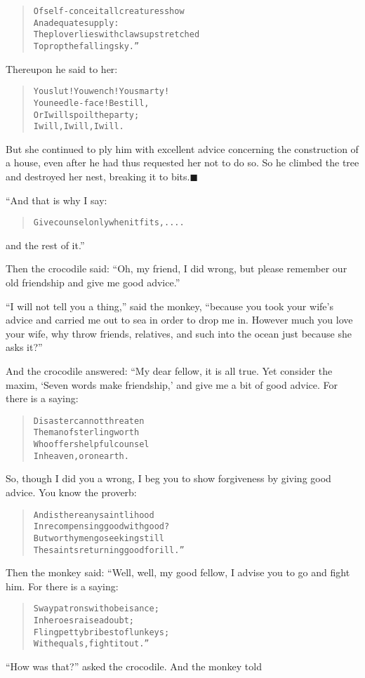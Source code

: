\documentclass[article, twoside, 14pt]{memoir}
\newcommand{\qed}{\hfill \ensuremath{\blacksquare}}
\renewenvironment{verbatim}{%
\begin{quote}%
\vskip -10pt%
\begin{alltt}\normalfont\large}{\end{alltt}%
\end{quote}%
\vskip -10pt
} %
\begin{document}
\begin{verbatim}
Of self-conceit all creatures show
    An adequate supply:
The plover lies with claws upstretched
    To prop the falling sky.”
\end{verbatim}
Thereupon he said to her:

\begin{verbatim}
You slut! You wench! You smarty!
    You needle-face! Be still,
Or I will spoil the party;
    I will, I will, I will.
\end{verbatim}
But she continued to ply him with excellent advice concerning the
construction of a house, even after he had thus requested her not
to do so. So he climbed the tree and destroyed her nest, breaking
it to bits.\hyperref[s75]{\qed}

“And that is why I say:

\begin{verbatim}
Give counsel only when it fits, ....
\end{verbatim}
and the rest of it.”

Then the crocodile said:
``Oh, my friend, I did wrong, but please remember our old friendship and give me good advice.''

``I will not tell you a thing,'' said the monkey,
``because you took your wife's advice and carried me out to sea in order to drop me in. However much you love your wife, why throw friends, relatives, and such into the ocean just because she asks it?''

And the crocodile answered: “My dear fellow, it is all true. Yet
consider the maxim, `Seven words make friendship,' and give me a
bit of good advice. For there is a saying:

\begin{verbatim}
Disaster cannot threaten
    The man of sterling worth
Who offers helpful counsel{\textemdash}
    In heaven, or on earth.
\end{verbatim}
So, though I did you a wrong, I beg you to show forgiveness by
giving good advice. You know the proverb:

\begin{verbatim}
And is there any saintlihood
In recompensing good with good?
But worthy men go seeking still
The saints returning good for ill.”
\end{verbatim}
Then the monkey said: “Well, well, my good fellow, I advise you to
go and fight him. For there is a saying:

\begin{verbatim}
Sway patrons with obeisance;
    In heroes raise a doubt;
Fling petty bribes to flunkeys;
    With equals, fight it out.”
\end{verbatim}
``How was that?'' asked the crocodile. And the monkey told
\end{document}
